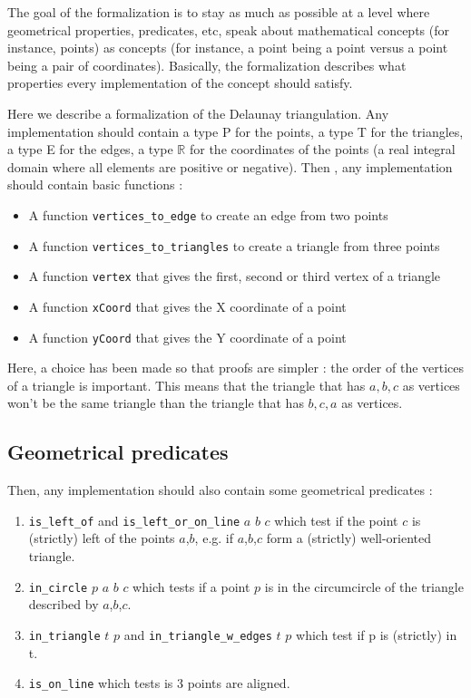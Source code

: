 \documentclass[a4paper,10pt]{article}
\begin{document}
The goal of the formalization is to stay as much as possible at a level where geometrical properties, predicates, etc, speak about mathematical concepts (for instance, points) as concepts (for instance, a point being a point versus a point being a pair of coordinates). Basically, the formalization describes what properties every implementation of the concept should satisfy.

Here we describe a formalization of the Delaunay triangulation. Any implementation should contain a type P for the points, a type T for the triangles, a type E for the edges, a type $\mathbb{R}$ for the coordinates of the points (a real integral domain where all elements are positive or negative).
Then , any implementation should contain basic functions :
\begin{itemize}
\item A function {\tt vertices\_to\_edge} to create an edge from two points
\item A function {\tt vertices\_to\_triangles} to create a triangle from three points
\item A function {\tt vertex}  that gives the first, second or third vertex of a triangle
\item A function {\tt xCoord} that gives the X coordinate of a point
\item A function {\tt yCoord} that gives the Y coordinate of a point
\end{itemize}

Here, a choice has been made so that proofs are simpler : the order of the vertices of a triangle is important. This means that the triangle that has $a,b,c$ as vertices won't be the same triangle than the triangle that has $b,c,a$ as vertices.

\subsection{Geometrical predicates}

Then, any implementation should also contain some geometrical predicates :
\begin{enumerate}
\item {\tt is\_left\_of} and {\tt is\_left\_or\_on\_line} $a$ $b$ $c$ which test if the point $c$ is (strictly) left of the points $a$,$b$, e.g. if $a$,$b$,$c$ form a (strictly) well-oriented triangle.
\item {\tt in\_circle} $p$ $a$ $b$ $c$ which tests if a point $p$ is in the circumcircle of the triangle described by $a$,$b$,$c$.
\item {\tt in\_triangle} $t$ $p$ and {\tt in\_triangle\_w\_edges} $t$ $p$ which test if p is (strictly) in t.
  \item {\tt is\_on\_line} which tests is 3 points are aligned.

\end{enumerate}
\end{document}
